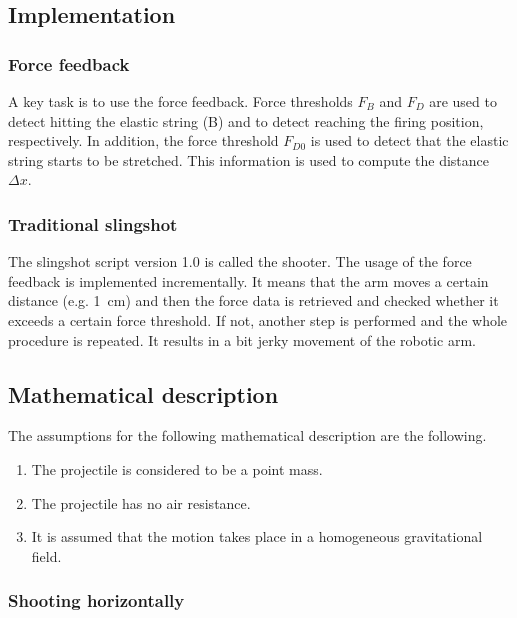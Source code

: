 	\subsection{Implementation}

		\subsubsection{Force feedback}	

			A key task is to use the force feedback. Force thresholds $F_B$ and $F_D$ are used to detect hitting the elastic string (B) and to detect reaching the firing position, respectively. In addition, the force threshold $F_{D0}$ is used to detect that the elastic string starts to be stretched. This information is used to compute the distance $\Delta x$.

		\subsubsection{Traditional slingshot} \label{sec: implementation of slingshot 1.0}
		The slingshot script version 1.0 is called the shooter. The usage of the force feedback is implemented incrementally. It means that the arm moves a certain distance (e.g. \SI{1}{cm}) and then the force data is retrieved and checked whether it exceeds a certain force threshold. If not, another step is performed and the whole procedure is repeated. It results in a bit jerky movement of the robotic arm.
	
	\subsection{Mathematical description}
	
		The assumptions for the following mathematical description are the following.
%		
\begin{enumerate}\itemsep0pt
			\item The projectile is considered to be a point mass.
			\item The projectile has no air resistance.
			\item It is assumed that the motion takes place in a homogeneous gravitational field.			
\end{enumerate}	
		
		\subsubsection{Shooting horizontally}			
			
